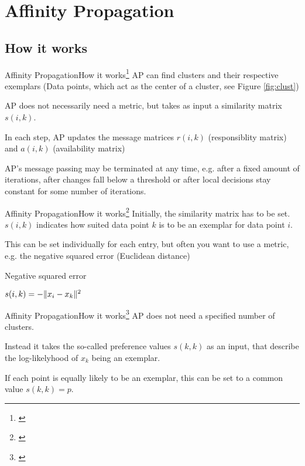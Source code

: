\documentclass{beamer}
\DeclarePairedDelimiter\norm{\lVert}{\rVert}
\begin{document}
\section{Affinity Propagation}
\subsection{How it works}
\begin{frame}{Affinity Propagation}{How it works\footnote{\cite{frey2007clustering}}}
	AP can find clusters and their respective \alert{exemplars} (Data points, which act as the center of a cluster, see Figure \ref{fig:clust})
	
	AP does not necessarily need a metric, but takes as input a \alert{similarity matrix} $s(i,k)$.
	
	In each step, AP updates the message matrices $r(i,k)$ (\alert{responsiblity matrix}) and $a(i,k)$ (\alert{availability matrix})
	
	AP's message passing may be terminated at any time, e.g. after a fixed amount of iterations, after changes fall below a threshold or after local decisions stay constant for some number of iterations.
\end{frame}

\begin{frame}{Affinity Propagation}{How it works\footnote{\cite{frey2007clustering}}}
	Initially, the similarity matrix has to be set. $s(i,k)$ indicates how suited data point $k$ is to be an exemplar for data point $i$.
	
	This can be set individually for each entry, but often you want to use a metric, e.g. the negative squared error (Euclidean distance)
	
	\begin{block}{Negative squared error}
		\begin{center}
			$s(i,k) = -\norm{x_i - x_k}^2$
		\end{center}
	\end{block}
\end{frame}

\begin{frame}{Affinity Propagation}{How it works\footnote{\cite{frey2007clustering}}}
    AP does not need a specified number of clusters.
    
    Instead it takes the so-called preference values $s(k,k)$ as an input, that describe the log-likelyhood of $x_k$ being an exemplar.
    
    If each point is equally likely to be an exemplar, this can be set to a common value $s(k,k) = p$.
\end{frame}
\end{document}
